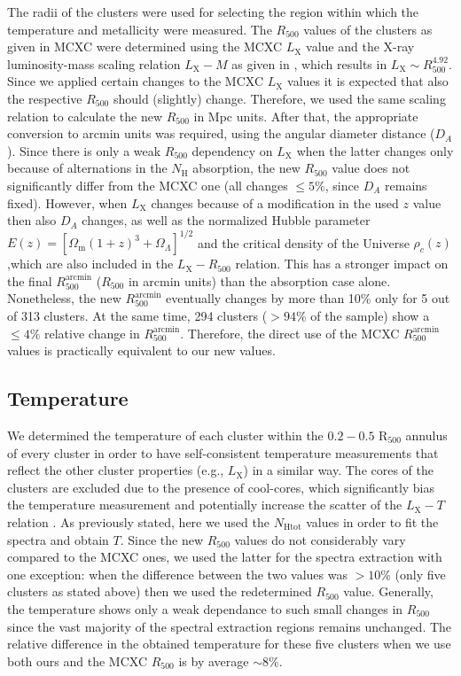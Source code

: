 \documentclass{aa}   %
\begin{document}
The radii of the clusters were used for selecting the region within which the temperature and metallicity were measured.
The $R_{500}$ values of the clusters as given in MCXC were determined using the MCXC $L_{\text{X}}$ value and the X-ray luminosity-mass scaling relation $L_{\text{X}}-M$ as given in \citet{arnaud2}, which results in $L_{\text{X}}\sim R_{500}^{4.92}$. Since we applied certain changes to the MCXC $L_{\text{X}}$ values it is expected that also the respective $R_{500}$ should (slightly) change. Therefore, we used the same scaling relation to calculate the new $R_{500}$ in Mpc units. After that, the appropriate conversion to arcmin units was required, using the angular diameter distance ($D_A$). Since there is only a weak $R_{500}$  dependency on $L_{\text{X}}$ when the latter changes only because of alternations in the $N_{\text{H}}$ absorption, the new $R_{500}$ value does not significantly differ from the MCXC one (all changes $\leq 5\%$, since $D_A$ remains fixed). However, when $L_{\text{X}}$ changes because of a modification in the used $z$ value then also $D_A$ changes, as well as the normalized Hubble parameter $E(z)=[\Omega_\text{m}(1+z)^3+\Omega_{\Lambda}]^{1/2}$ and the critical density of the Universe $\rho_c(z)$ ,which are also included in the $L_{\text{X}}-R_{500}$ relation. This has a stronger impact on the final $R_{500}^{\text{arcmin}}$ ($R_{500}$ in arcmin units) than the absorption case alone. 
Nonetheless, the new $R_{500}^{\text{arcmin}}$ eventually changes by more than 10\% only for 5 out of 313 clusters. At the same time, 294 clusters ($>94\%$ of the sample) show a $\leq 4\%$ relative change in $R_{500}^{\text{arcmin}}$. Therefore, the direct use of the MCXC $R_{500}^{\text{arcmin}}$ values is practically equivalent to our new values.


\subsection{Temperature} \label{temperat}

We determined the temperature of each cluster within the $0.2-0.5$ R$_{500}$ annulus of every cluster in order to have self-consistent temperature measurements that reflect the other cluster properties (e.g., $L_{\text{X}}$) in a similar way. The cores of the clusters are excluded due to the presence of cool-cores, which significantly bias the temperature measurement and potentially increase the scatter of the $L_{\text{X}}-T$ relation \citep[e.g.,][]{hudson}. As previously stated, here we used the $N_{\text{Htot}}$ values in order to fit the spectra and obtain $T$. Since the new $R_{500}$ values do not considerably vary compared to the MCXC ones, we used the latter for the spectra extraction with one exception: when the difference between the two values was $>10\%$ (only five clusters as stated above) then we used the redetermined $R_{500}$ value. Generally, the temperature shows only a weak dependance to such small changes in $R_{500}$ since the vast majority of the spectral extraction regions remains unchanged. The relative difference in the obtained temperature for these five clusters when we use both ours and the MCXC $R_{500}$ is by average $\sim 8\%$.
\end{document}

